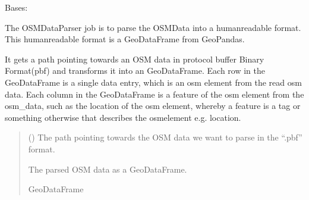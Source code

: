 \documentclass[letterpaper,10pt,english]{sphinxmanual}
\begin{document}
\begin{fulllineitems}
\label{\detokenize{apidoc/src.osm_configurator.model.parser:src.osm_configurator.model.parser.osm_data_parser_interface.OSMDataParserInterface}}
\pysigstartsignatures
{}
\pysigstopsignatures
\sphinxAtStartPar
Bases: 

\sphinxAtStartPar
The OSMDataParser job is to parse the OSMData into a human\sphinxhyphen{}readable format.
This human\sphinxhyphen{}readable format is a GeoDataFrame from GeoPandas.

\begin{fulllineitems}
\label{\detokenize{apidoc/src.osm_configurator.model.parser:src.osm_configurator.model.parser.osm_data_parser_interface.OSMDataParserInterface.parse_osm_data_file}}
\pysigstartsignatures
{}
\pysigstopsignatures
\sphinxAtStartPar
It gets a path pointing towards an OSM data in protocol buffer Binary Format(pbf) and transforms it into an
GeoDataFrame.
Each row in the GeoDataFrame is a single data entry, which is an osm element from the read osm data.
Each column in the GeoDataFrame is a feature of the osm element from the osm\_data, such as the location of the
osm element, whereby a feature is a tag or something otherwise that describes the osm\sphinxhyphen{}element e.g. location.
\begin{quote}\begin{description}
\sphinxAtStartPar
{} () \textendash{} The path pointing towards the OSM data we want to parse in the “.pbf” format.

\sphinxAtStartPar
The parsed OSM data as a GeoDataFrame.

\sphinxAtStartPar
GeoDataFrame

\end{description}\end{quote}

\end{fulllineitems}


\end{fulllineitems}
\end{document}
